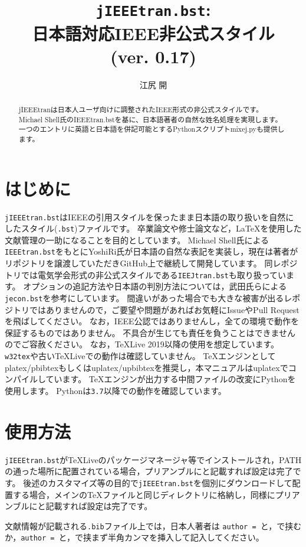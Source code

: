 \documentclass[11pt, a4paper, dvipdfmx, uplatex]{jsarticle}
\title{\texttt{jIEEEtran.bst}:\\日本語対応IEEE非公式\BibTeX スタイル\\(ver. 0.17)}
\author{江尻 開}
\begin{document}
\maketitle

\begin{abstract}
jIEEEtranは日本人ユーザ向けに調整されたIEEE形式の非公式\BibTeX スタイルです。
Michael Shell氏のIEEEtran.bstを基に、日本語著者の自然な姓名処理を実現します。
一つのエントリに英語と日本語を併記可能とするPythonスクリプトmixej.pyも提供します。
\end{abstract}


\section{はじめに}

\texttt{jIEEEtran.bst}はIEEEの引用スタイルを保ったまま日本語の取り扱いを自然にした\BibTeX スタイル(\texttt{.bst})ファイルです。
卒業論文や修士論文など，\LaTeX を使用した文献管理の一助になることを目的としています。
Michael Shell氏による\texttt{IEEEtran.bst}\cite{IEEEtran}をもとにYoshiRi氏が日本語の自然な表記を実装し，現在は著者がリポジトリを譲渡していただきGitHub上\cite{jIEEEtran}で継続して開発しています。
同レポジトリでは電気学会形式の非公式\BibTeX スタイルである\texttt{IEEJtran.bst}も取り扱っています。
オプションの追記方法や日本語の判別方法については，武田氏らによる\texttt{jecon.bst}\cite{jeconbst}を参考にしています。
間違いがあった場合でも大きな被害が出るレポジトリではありませんので，ご要望や問題があればお気軽にIssueやPull Requestを飛ばしてください。
なお，IEEE公認ではありませんし，全ての環境で動作を保証するものではありません。
不具合が生じても責任を負うことはできませんのでご容赦ください。
なお，\TeX Live 2019以降の使用を想定しています。
\texttt{w32tex}や古い\TeX Liveでの動作は確認していません。
\TeX エンジンとしてplatex/pbibtexもしくはuplatex/upbibtexを推奨し，本マニュアルはuplatexでコンパイルしています。
\TeX エンジンが出力する中間ファイルの改変にPythonを使用します。
Pythonは\texttt{3.7}以降での動作を確認しています。


\section{使用方法}

\texttt{jIEEEtran.bst}が\TeX Liveのパッケージマネージャ等でインストールされ，PATHの通った場所に配置されている場合，プリアンブルに\texttt{\string{}}と記載すれば設定は完了です。
後述のカスタマイズ等の目的で\texttt{jIEEEtran.bst}を個別にダウンロードして配置する場合，メインの\TeX ファイルと同じディレクトリに格納し，同様にプリアンブルに\texttt{\string{}}と記載すれば設定は完了です。

文献情報が記載される\texttt{.bib}ファイル上では，日本人著者は
\texttt{author = }と，\texttt{\string{\string}}で挟むか，\texttt{author = }と，\texttt{\string{\string}}で挟まず半角カンマを挿入して記入してください。
\end{document}
